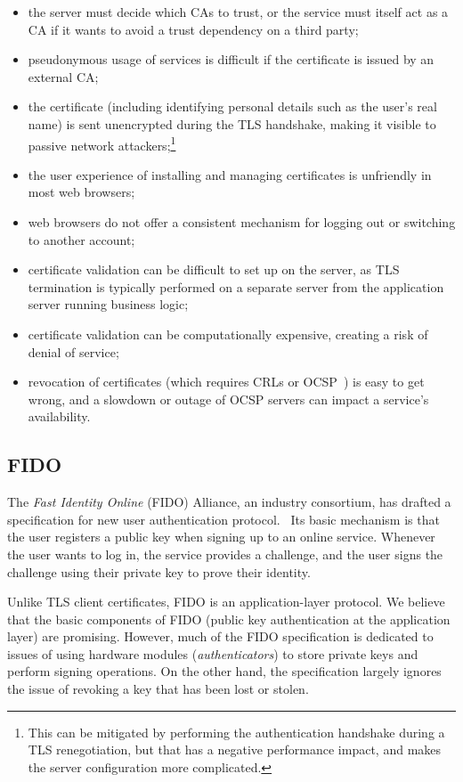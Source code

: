 \begin{itemize}
\item the server must decide which CAs to trust, or the service must itself act as a CA if it wants
to avoid a trust dependency on a third party;
\item pseudonymous usage of services is difficult if the certificate is issued by an external CA;
\item the certificate (including identifying personal details such as the user's real name) is sent
unencrypted during the TLS handshake, making it visible to passive network attackers;\footnote{This
can be mitigated by performing the authentication handshake during a TLS renegotiation, but that has
a negative performance impact, and makes the server configuration more complicated.}
\item the user experience of installing and managing certificates is unfriendly in most web
browsers;
\item web browsers do not offer a consistent mechanism for logging out or switching to another
account;
\item certificate validation can be difficult to set up on the server, as TLS termination is
typically performed on a separate server from the application server running business logic;
\item certificate validation can be computationally expensive, creating a risk of denial of
service;~\cite{Parsovs14}
\item revocation of certificates (which requires CRLs or OCSP~\cite{OCSP}) is easy to get wrong, and
a slowdown or outage of OCSP servers can impact a service's availability.
\end{itemize}

\subsection{FIDO}

The \emph{Fast Identity Online} (FIDO) Alliance, an industry consortium, has drafted a specification
for new user authentication protocol.~\cite{FIDOOverview, FIDOSpec} Its basic mechanism is that the
user registers a public key when signing up to an online service. Whenever the user wants to log in,
the service provides a challenge, and the user signs the challenge using their private key to prove
their identity.

Unlike TLS client certificates, FIDO is an application-layer protocol. We believe that the basic
components of FIDO (public key authentication at the application layer) are promising. However, much
of the FIDO specification is dedicated to issues of using hardware modules (\emph{authenticators})
to store private keys and perform signing operations. On the other hand, the specification largely
ignores the issue of revoking a key that has been lost or stolen.

